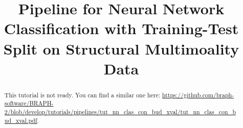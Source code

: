\documentclass[justified]{tufte-handout}
\title[Classification Training-Test Split Structural Multimoality Data]{Pipeline for Neural Network Classification with Training-Test Split on Structural Multimoality Data}
\begin{document}
\maketitle

\begin{abstract}
\noindent
This tutorial is not ready. You can find a similar one here: \url{https://github.com/braph-software/BRAPH-2/blob/develop/tutorials/pipelines/tut_nn_clas_con_bud_xval/tut_nn_clas_con_bud_xval.pdf}.
\end{abstract}
\end{document}
